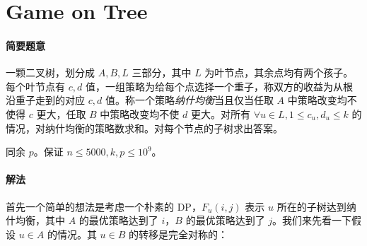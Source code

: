 \documentclass[12pt]{ctexart}
\theoremstyle{theorem}
\theoremstyle{theorem}
\begin{document}
\newpage

\section{Game on Tree}

\paragraph{简要题意}

一颗二叉树，划分成 $A,B,L$ 三部分，其中 $L$ 为叶节点，其余点均有两个孩子。每个叶节点有 $c,d$ 值，一组策略为给每个点选择一个重子，称双方的收益为从根沿重子走到的对应 $c,d$ 值。称一个策略\emph{纳什均衡}当且仅当任取 $A$ 中策略改变均不使得 $c$ 更大，任取 $B$ 中策略改变均不使 $d$ 更大。对所有 $\forall u\in L,1\le c_u,d_u\le k$ 的情况，对纳什均衡的策略数求和。对每个节点的子树求出答案。

同余 $p$。保证 $n\le 5000, k,p\le 10^9$。

\paragraph{解法}

首先一个简单的想法是考虑一个朴素的 DP，$F_u(i, j)$ 表示 $u$ 所在的子树达到纳什均衡，其中 $A$ 的最优策略达到了 $i$，$B$ 的最优策略达到了 $j$。我们来先看一下假设 $u\in A$ 的情况。其 $u\in B$ 的转移是完全对称的：
\end{document}
